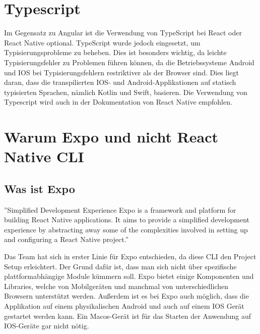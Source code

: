 \section{Typescript}
Im Gegensatz zu Angular ist die Verwendung von TypeScript bei React oder React Native optional. TypeScript wurde jedoch eingesetzt, um Typisierungsprobleme zu beheben. Dies ist besonders wichtig, da leichte Typisierungsfehler zu Problemen führen können, da die Betriebssysteme Android und IOS  bei Typisierungsfehlern restriktiver als der Browser sind. Dies liegt daran, dass die transpilierten IOS- und Android-Applikationen auf statisch typisierten Sprachen, nämlich Kotlin und Swift, basieren.
Die Verwendung von Typescript wird auch  in der Dokumentation von React Native empfohlen. \cite{typescript-with-react-native}


\section{Warum Expo und nicht React Native CLI}

\subsection{Was ist Expo}
''Simplified Development Experience Expo is a framework and platform for building React Native applications. It aims to provide a simplified development experience by abstracting away some of the complexities involved in setting up and configuring a React Native project.''\cite{expo}

Das Team hat sich in erster Linie für Expo entschieden, da diese CLI den Project Setup erleichtert.
Der Grund dafür ist, dass man sich nicht über spezifische plattformabhängige Module kümmern soll.
Expo bietet einige Komponenten und Libraries, welche von Mobilgeräten und manchmal von unterschiedlichen Browsern unterstützt werden.
Außerdem ist es bei Expo auch möglich,
dass die Applikation auf einem physikalischen Android und auch auf einem IOS Gerät gestartet werden kann.
Ein Macos-Gerät ist für das Starten der Anwendung auf IOS-Geräte gar nicht nötig. \cite{expo}